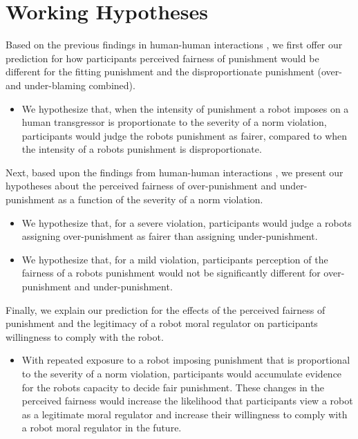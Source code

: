 \documentclass{article} %
\begin{document}
\section{Working Hypotheses}
Based on the previous findings in human-human interactions \cite{miller1981social,hogan1981retributive,ball1994just}, we first offer our prediction for how participants perceived fairness of punishment would be different for the fitting punishment and the disproportionate punishment (over- and under-blaming combined).
\begin{itemize}
\item We hypothesize that, when the intensity of punishment a robot imposes on a human transgressor is proportionate to the severity of a norm violation, participants would judge the robots punishment as fairer, compared to when the intensity of a robots punishment is disproportionate.
\end{itemize}

Next, based upon the findings from human-human interactions \cite{wagstaff1997overpunishment}, we present our hypotheses about the perceived fairness of over-punishment and under-punishment as a function of the severity of a norm violation.
\begin{itemize}
\item We hypothesize that, for a severe violation, participants would judge a robots assigning over-punishment as fairer than assigning under-punishment.
\item We hypothesize that, for a mild violation, participants perception of the fairness of a robots punishment would not be significantly different for over-punishment and under-punishment.
\end{itemize}

Finally, we explain our prediction for the effects of the perceived fairness of punishment and the legitimacy of a robot moral regulator on participants willingness to comply with the robot.
\begin{itemize}
\item With repeated exposure to a robot imposing punishment that is proportional to the severity of a norm violation, participants would accumulate evidence for the robots capacity to decide fair punishment. These changes in the perceived fairness would increase the likelihood that participants view a robot as a legitimate moral regulator and increase their willingness to comply with a robot moral regulator in the future.
\end{itemize}
\end{document}
